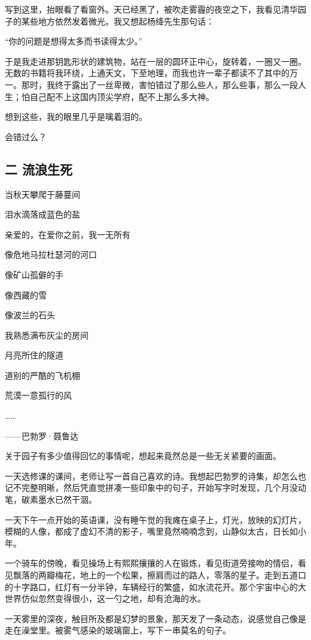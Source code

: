 \documentclass[openany,scheme = chinese, linespread = 1.5]{ctexbook}
\begin{document}
写到这里，抬眼看了看窗外。天已经黑了，被吹走雾霾的夜空之下，我看见清华园子的某些地方依然发着微光。我又想起杨绛先生那句话：

“你的问题是想得太多而书读得太少。”

于是我走进那钥匙形状的建筑物，站在一层的圆环正中心，旋转着，一圈又一圈。无数的书籍将我环绕，上通天文，下至地理，而我也许一辈子都读不了其中的万一。那时，我终于露出了一丝卑微，害怕错过了那么些人，那么些事，那么一段人生；怕自己配不上这国内顶尖学府，配不上那么多大神。

想到这些，我的眼里几乎是噙着泪的。

会错过么？
\subsection*{二 \quad 流浪生死}
\begin{center}
当秋天攀爬于藤蔓间

泪水滴落成蓝色的盐

亲爱的，在爱你之前，我一无所有

像危地马拉杜瑟河的河口

像矿山孤僻的手

像西藏的雪

像波兰的石头

我熟悉满布灰尘的房间

月亮所住的隧道

道别的严酷的飞机棚

荒漠一意孤行的风

……

——巴勃罗·聂鲁达

\end{center}
关于园子有多少值得回忆的事情呢，想起来竟然总是一些无关紧要的画面。

一天选修课的课间，老师让写一首自己喜欢的诗。我想起巴勃罗的诗集，却怎么也记不完整明晰，然后凭直觉拼凑一些印象中的句子，开始写字时发现，几个月没动笔，碳素墨水已然干涸。

一天下午一点开始的英语课，没有睡午觉的我瘫在桌子上，灯光，放映的幻灯片，模糊的人像，都成了虚幻不清的影子，嘴里竟然喃喃念到，山静似太古，日长如小年。

一个骑车的傍晚，看见操场上有熙熙攘攘的人在锻炼，看见街道旁接吻的情侣，看见飘落的两瓣梅花，地上的一个松果，擦肩而过的路人，零落的星子。走到五道口的十字路口，红灯有一分半钟，车辆经行的繁盛，如水流花开。那个宇宙中心的大世界仿似忽然变得很小，这一勺之地，却有沧海的水。

一天雾里的深夜，触目所及都是幻梦的景象，那天发了一条动态，说感觉自己像是走在澡堂里。被雾气感染的玻璃窗上，写下一串莫名的句子。
\end{document}
